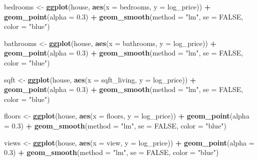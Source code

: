 \documentclass[
]{article}
\newenvironment{Shaded}{\begin{snugshade}}{\end{snugshade}}
\newcommand{\AttributeTok}[1]{\textcolor[rgb]{0.13,0.29,0.53}{#1}}
\newcommand{\ConstantTok}[1]{\textcolor[rgb]{0.56,0.35,0.01}{#1}}
\newcommand{\FloatTok}[1]{\textcolor[rgb]{0.00,0.00,0.81}{#1}}
\newcommand{\FunctionTok}[1]{\textcolor[rgb]{0.13,0.29,0.53}{\textbf{#1}}}
\newcommand{\NormalTok}[1]{#1}
\newcommand{\OtherTok}[1]{\textcolor[rgb]{0.56,0.35,0.01}{#1}}
\newcommand{\SpecialCharTok}[1]{\textcolor[rgb]{0.81,0.36,0.00}{\textbf{#1}}}
\newcommand{\StringTok}[1]{\textcolor[rgb]{0.31,0.60,0.02}{#1}}
\begin{document}
\begin{Shaded}
\begin{Highlighting}[]
\NormalTok{bedrooms }\OtherTok{\textless{}{-}} \FunctionTok{ggplot}\NormalTok{(house, }\FunctionTok{aes}\NormalTok{(}\AttributeTok{x =}\NormalTok{ bedrooms, }\AttributeTok{y =}\NormalTok{ log\_price)) }\SpecialCharTok{+}
  \FunctionTok{geom\_point}\NormalTok{(}\AttributeTok{alpha =} \FloatTok{0.3}\NormalTok{) }\SpecialCharTok{+}
  \FunctionTok{geom\_smooth}\NormalTok{(}\AttributeTok{method =} \StringTok{"lm"}\NormalTok{, }\AttributeTok{se =} \ConstantTok{FALSE}\NormalTok{, }\AttributeTok{color =} \StringTok{"blue"}\NormalTok{)}

\NormalTok{bathrooms }\OtherTok{\textless{}{-}} \FunctionTok{ggplot}\NormalTok{(house, }\FunctionTok{aes}\NormalTok{(}\AttributeTok{x =}\NormalTok{ bathrooms, }\AttributeTok{y =}\NormalTok{ log\_price)) }\SpecialCharTok{+}
  \FunctionTok{geom\_point}\NormalTok{(}\AttributeTok{alpha =} \FloatTok{0.3}\NormalTok{) }\SpecialCharTok{+}
  \FunctionTok{geom\_smooth}\NormalTok{(}\AttributeTok{method =} \StringTok{"lm"}\NormalTok{, }\AttributeTok{se =} \ConstantTok{FALSE}\NormalTok{, }\AttributeTok{color =} \StringTok{"blue"}\NormalTok{)}

\NormalTok{sqft }\OtherTok{\textless{}{-}} \FunctionTok{ggplot}\NormalTok{(house, }\FunctionTok{aes}\NormalTok{(}\AttributeTok{x =}\NormalTok{ sqft\_living, }\AttributeTok{y =}\NormalTok{ log\_price)) }\SpecialCharTok{+}
  \FunctionTok{geom\_point}\NormalTok{(}\AttributeTok{alpha =} \FloatTok{0.3}\NormalTok{) }\SpecialCharTok{+}
  \FunctionTok{geom\_smooth}\NormalTok{(}\AttributeTok{method =} \StringTok{"lm"}\NormalTok{, }\AttributeTok{se =} \ConstantTok{FALSE}\NormalTok{, }\AttributeTok{color =} \StringTok{"blue"}\NormalTok{)}

\NormalTok{floors }\OtherTok{\textless{}{-}} \FunctionTok{ggplot}\NormalTok{(house, }\FunctionTok{aes}\NormalTok{(}\AttributeTok{x =}\NormalTok{ floors, }\AttributeTok{y =}\NormalTok{ log\_price)) }\SpecialCharTok{+}
  \FunctionTok{geom\_point}\NormalTok{(}\AttributeTok{alpha =} \FloatTok{0.3}\NormalTok{) }\SpecialCharTok{+}
  \FunctionTok{geom\_smooth}\NormalTok{(}\AttributeTok{method =} \StringTok{"lm"}\NormalTok{, }\AttributeTok{se =} \ConstantTok{FALSE}\NormalTok{, }\AttributeTok{color =} \StringTok{"blue"}\NormalTok{)}

\NormalTok{views }\OtherTok{\textless{}{-}} \FunctionTok{ggplot}\NormalTok{(house, }\FunctionTok{aes}\NormalTok{(}\AttributeTok{x =}\NormalTok{ view, }\AttributeTok{y =}\NormalTok{ log\_price)) }\SpecialCharTok{+}
  \FunctionTok{geom\_point}\NormalTok{(}\AttributeTok{alpha =} \FloatTok{0.3}\NormalTok{) }\SpecialCharTok{+}
  \FunctionTok{geom\_smooth}\NormalTok{(}\AttributeTok{method =} \StringTok{"lm"}\NormalTok{, }\AttributeTok{se =} \ConstantTok{FALSE}\NormalTok{, }\AttributeTok{color =} \StringTok{"blue"}\NormalTok{)}


\end{Highlighting}
\end{Shaded}
\end{document}
